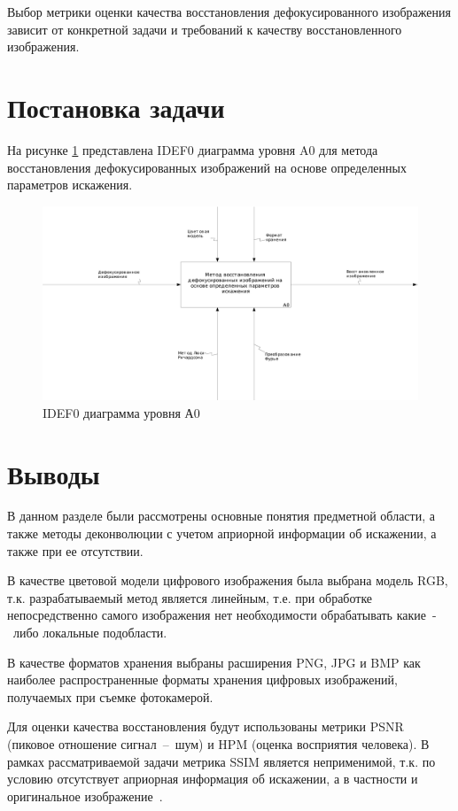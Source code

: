 Выбор метрики оценки качества восстановления дефокусированного изображения зависит от конкретной задачи и требований к качеству восстановленного изображения.

\section{Постановка задачи}

На рисунке \ref{fig:idef0} представлена IDEF0 диаграмма уровня A0 для метода восстановления дефокусированных изображений на основе определенных параметров искажения. 

\begin{figure}[H]
	\centering
	\includegraphics[scale=0.4]{assets/01_A0}
	\caption{IDEF0 диаграмма уровня А0}
	\label{fig:idef0}
\end{figure}

\section*{Выводы}

В данном разделе были рассмотрены основные понятия предметной области, а также методы деконволюции с учетом априорной информации об искажении, а также при ее отсутствии.

В качестве цветовой модели цифрового изображения была выбрана модель RGB, т.к. разрабатываемый метод является линейным, т.е. при обработке непосредственно самого изображения нет необходимости обрабатывать какие~-~либо локальные подобласти.

В качестве форматов хранения выбраны расширения PNG, JPG и BMP как наиболее распространенные форматы хранения цифровых изображений, получаемых при съемке фотокамерой.

Для оценки качества восстановления будут использованы метрики PSNR (пиковое отношение сигнал~--~шум) и HPM (оценка восприятия человека). В рамках рассматриваемой задачи метрика SSIM является неприменимой, т.к. по условию отсутствует априорная информация об искажении, а в частности и оригинальное изображение~\cite{psnr_ssim}. 

